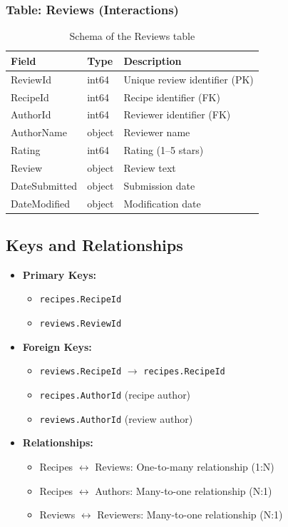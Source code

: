 \documentclass[11pt,a4paper]{article}
\begin{document}
\subsubsection{Table: Reviews (Interactions)}

\begin{table}[H]
\centering
\begin{tabular}{llp{7cm}}
\toprule
\textbf{Field} & \textbf{Type} & \textbf{Description} \\
\midrule
ReviewId & int64 & Unique review identifier (PK) \\
RecipeId & int64 & Recipe identifier (FK) \\
AuthorId & int64 & Reviewer identifier (FK) \\
AuthorName & object & Reviewer name \\
Rating & int64 & Rating (1--5 stars) \\
Review & object & Review text \\
DateSubmitted & object & Submission date \\
DateModified & object & Modification date \\
\bottomrule
\end{tabular}
\caption{Schema of the Reviews table}
\label{tab:schema_reviews}
\end{table}

\subsection{Keys and Relationships}

\begin{itemize}
    \item \textbf{Primary Keys:}
    \begin{itemize}
        \item \texttt{recipes.RecipeId}
        \item \texttt{reviews.ReviewId}
    \end{itemize}

    \item \textbf{Foreign Keys:}
    \begin{itemize}
        \item \texttt{reviews.RecipeId} $\rightarrow$ \texttt{recipes.RecipeId}
        \item \texttt{recipes.AuthorId} (recipe author)
        \item \texttt{reviews.AuthorId} (review author)
    \end{itemize}

    \item \textbf{Relationships:}
    \begin{itemize}
        \item Recipes $\leftrightarrow$ Reviews: One-to-many relationship (1:N)
        \item Recipes $\leftrightarrow$ Authors: Many-to-one relationship (N:1)
        \item Reviews $\leftrightarrow$ Reviewers: Many-to-one relationship (N:1)
    \end{itemize}
\end{itemize}
\end{document}
